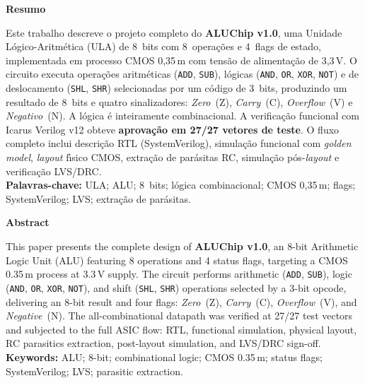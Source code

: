 \documentclass[12pt,a4paper]{article}
\begin{document}
\newpage

\begin{center}{\large\bfseries Resumo}\end{center}
\begin{unidadebox}[Resumo]
Este trabalho descreve o projeto completo do \textbf{ALUChip v1.0}, uma Unidade L\'{o}gico-Aritm\'{e}tica (ULA) de 8~bits com 8~opera\c{c}\~{o}es e 4~flags de estado, implementada em processo CMOS 0,35\,\textmu m com tens\~{a}o de alimenta\c{c}\~{a}o de 3,3\,V. O circuito executa opera\c{c}\~{o}es aritm\'{e}ticas (\texttt{ADD}, \texttt{SUB}), l\'{o}gicas (\texttt{AND}, \texttt{OR}, \texttt{XOR}, \texttt{NOT}) e de deslocamento (\texttt{SHL}, \texttt{SHR}) selecionadas por um c\'{o}digo de 3~bits, produzindo um resultado de 8~bits e quatro sinalizadores: \textit{Zero}~(Z), \textit{Carry}~(C), \textit{Overflow}~(V) e \textit{Negativo}~(N). A l\'{o}gica \'{e} inteiramente combinacional. A verifica\c{c}\~{a}o funcional com Icarus Verilog v12 obteve \textbf{aprova\c{c}\~{a}o em 27/27 vetores de teste}. O fluxo completo inclui descri\c{c}\~{a}o RTL (SystemVerilog), simula\c{c}\~{a}o funcional com \textit{golden model}, \textit{layout} f\'{\i}sico CMOS, extra\c{c}\~{a}o de par\'{a}sitas RC, simula\c{c}\~{a}o p\'{o}s-\textit{layout} e verifica\c{c}\~{a}o LVS/DRC.\\[4pt]
\textbf{Palavras-chave:} ULA; ALU; 8~bits; l\'{o}gica combinacional; CMOS 0,35\,\textmu m; flags; SystemVerilog; LVS; extra\c{c}\~{a}o de par\'{a}sitas.
\end{unidadebox}

\vspace{6pt}
\begin{center}{\large\bfseries Abstract}\end{center}
\begin{unidadebox}[Abstract]
This paper presents the complete design of \textbf{ALUChip v1.0}, an 8-bit Arithmetic Logic Unit (ALU) featuring 8 operations and 4 status flags, targeting a CMOS 0.35\,\textmu m process at 3.3\,V supply. The circuit performs arithmetic (\texttt{ADD}, \texttt{SUB}), logic (\texttt{AND}, \texttt{OR}, \texttt{XOR}, \texttt{NOT}), and shift (\texttt{SHL}, \texttt{SHR}) operations selected by a 3-bit opcode, delivering an 8-bit result and four flags: \textit{Zero}~(Z), \textit{Carry}~(C), \textit{Overflow}~(V), and \textit{Negative}~(N). The all-combinational datapath was verified at 27/27 test vectors and subjected to the full ASIC flow: RTL, functional simulation, physical layout, RC parasitics extraction, post-layout simulation, and LVS/DRC sign-off.\\[4pt]
\textbf{Keywords:} ALU; 8-bit; combinational logic; CMOS 0.35\,\textmu m; status flags; SystemVerilog; LVS; parasitic extraction.
\end{unidadebox}
\end{document}
